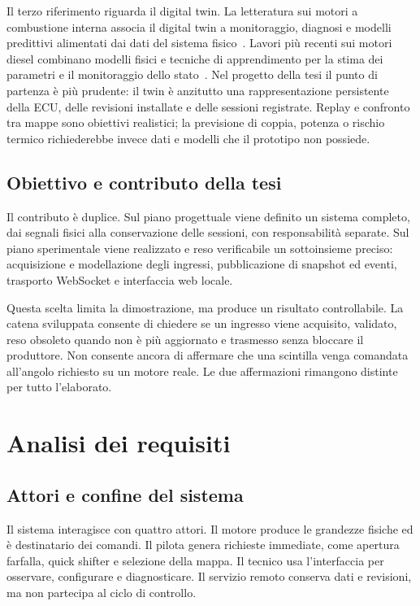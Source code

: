 \documentclass{article}
\begin{document}
Il terzo riferimento riguarda il digital twin. La letteratura sui motori a
combustione interna associa il digital twin a monitoraggio, diagnosi e modelli
predittivi alimentati dai dati del sistema fisico~\cite{tran_dt}. Lavori più
recenti sui motori diesel combinano modelli fisici e tecniche di apprendimento
per la stima dei parametri e il monitoraggio dello stato~\cite{nath_dt}. Nel
progetto della tesi il punto di partenza è più prudente: il twin è anzitutto una
rappresentazione persistente della ECU, delle revisioni installate e delle
sessioni registrate. Replay e confronto tra mappe sono obiettivi realistici;
la previsione di coppia, potenza o rischio termico richiederebbe invece dati e
modelli che il prototipo non possiede.

\subsection{Obiettivo e contributo della tesi}

Il contributo è duplice. Sul piano progettuale viene definito un sistema
completo, dai segnali fisici alla conservazione delle sessioni, con responsabilità
separate. Sul piano sperimentale viene realizzato e reso verificabile un
sottoinsieme preciso: acquisizione e modellazione degli ingressi, pubblicazione
di snapshot ed eventi, trasporto WebSocket e interfaccia web locale.

Questa scelta limita la dimostrazione, ma produce un risultato controllabile.
La catena sviluppata consente di chiedere se un ingresso viene acquisito,
validato, reso obsoleto quando non è più aggiornato e trasmesso senza bloccare il
produttore. Non consente ancora di affermare che una scintilla venga comandata
all'angolo richiesto su un motore reale. Le due affermazioni rimangono distinte
per tutto l'elaborato.

\section{Analisi dei requisiti}
\label{sec:requisiti}

\subsection{Attori e confine del sistema}

Il sistema interagisce con quattro attori. Il motore produce le grandezze
fisiche ed è destinatario dei comandi. Il pilota genera richieste immediate,
come apertura farfalla, quick shifter e selezione della mappa. Il tecnico usa
l'interfaccia per osservare, configurare e diagnosticare. Il servizio remoto
conserva dati e revisioni, ma non partecipa al ciclo di controllo.
\end{document}
